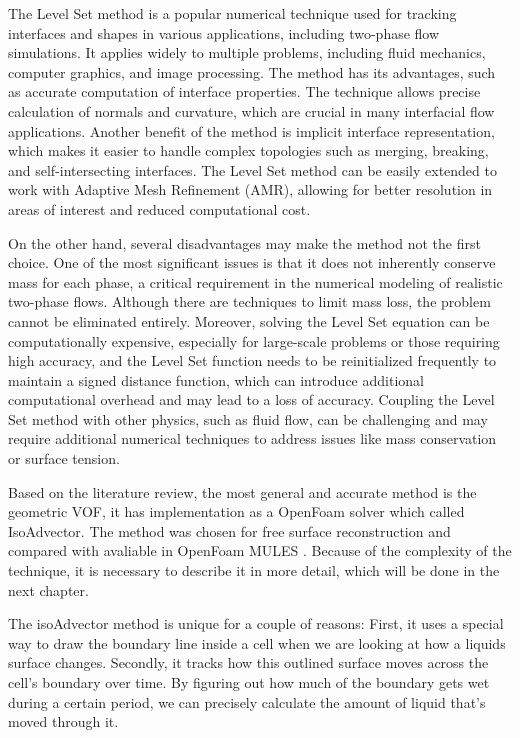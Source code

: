 The Level Set method is a popular numerical technique used for tracking interfaces and shapes in various applications, including two-phase flow simulations. It applies widely to multiple problems, including fluid mechanics, computer graphics, and image processing. The method has its advantages, such as accurate computation of interface properties. The technique allows precise calculation of normals and curvature, which are crucial in many interfacial flow applications. Another benefit of the method is implicit interface representation, which makes it easier to handle complex topologies such as merging, breaking, and self-intersecting interfaces. The Level Set method can be easily extended to work with Adaptive Mesh Refinement (AMR), allowing for better resolution in areas of interest and reduced computational cost.

On the other hand, several disadvantages may make the method not the first choice. One of the most significant issues is that it does not inherently conserve mass for each phase, a critical requirement in the numerical modeling of realistic two-phase flows. Although there are techniques to limit mass loss, the problem cannot be eliminated entirely. Moreover, solving the Level Set equation can be computationally expensive, especially for large-scale problems or those requiring high accuracy, and the Level Set function needs to be reinitialized frequently to maintain a signed distance function, which can introduce additional computational overhead and may lead to a loss of accuracy. Coupling the Level Set method with other physics, such as fluid flow, can be challenging and may require additional numerical techniques to address issues like mass conservation or surface tension.

Based on the literature review, the most general and accurate method is the geometric VOF, it has implementation as a OpenFoam solver \cite{roenby2019isoadvector} which called IsoAdvector. The method was chosen for free surface reconstruction and compared with avaliable in OpenFoam MULES \cite{MULES}. Because of the complexity of the technique, it is necessary to describe it in more detail, which will be done in the next chapter.

The isoAdvector method is unique for a couple of reasons: First, it uses a special way to draw the boundary line inside a cell when we are looking at how a liquids surface changes. Secondly, it tracks how this outlined surface moves across the cell's boundary over time. By figuring out how much of the boundary gets wet during a certain period, we can precisely calculate the amount of liquid that's moved through it.

